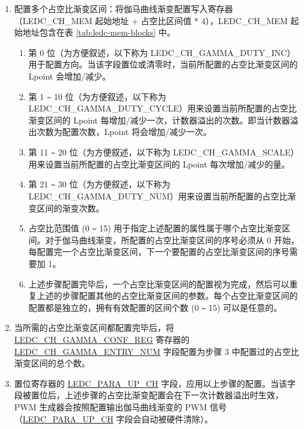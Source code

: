 \documentclass[main\_\_CN.tex]{subfiles}
\begin{document}
\begin{enumerate}
\begin{enumerate}
\begin{enumerate}
    \item 配置多个占空比渐变区间：将伽马曲线渐变配置写入寄存器（LEDC\_CH\_MEM 起始地址 + 占空比区间值 * 4），LEDC\_CH\_MEM  起始地址包含在表 \ref{tab:ledc-mem-blocks} 中。
    \begin{enumerate}
        \item 第 0 位（为方便叙述，以下称为 LEDC\_CH\_GAMMA\_DUTY\_INC）用于配置方向。当该字段置位或清零时，当前所配置的占空比渐变区间的 Lpoint 会增加/减少。
        \item 第 1 \verb+~+ 10 位（为方便叙述，以下称为 LEDC\_CH\_GAMMA\_DUTY\_CYCLE）用来设置当前所配置的占空比渐变区间的 Lpoint 每增加/减少一次，计数器溢出的次数。即当计数器溢出次数为配置次数，Lpoint 将会增加/减少一次。
        \item 第 11 \verb+~+ 20 位（为方便叙述，以下称为 LEDC\_CH\_GAMMA\_SCALE）用来设置当前所配置的占空比渐变区间的 Lpoint 每次增加/减少的量。
        \item 第 21 \verb+~+ 30 位（为方便叙述，以下称为 LEDC\_CH\_GAMMA\_DUTY\_NUM）用来设置当前所配置的占空比渐变区间的渐变次数。
        \item 占空比范围值 (0 \verb+~+ 15) 用于指定上述配置的属性属于哪个占空比渐变区间。对于伽马曲线渐变，所配置的占空比渐变区间的序号必须从 0 开始，每配置完一个占空比渐变区间，下一个要配置的占空比渐变区间的序号需要加 1。
        \item 上述步骤配置完毕后，一个占空比渐变区间的配置视为完成，然后可以重复上述的步骤配置其他的占空比渐变区间的参数。每个占空比渐变区间的配置都是独立的，拥有有效配置的区间个数 (0 \verb+~+ 15) 可以是任意的。
    \end{enumerate}
    \item 当所需的占空比渐变区间都配置完毕后，将 \hyperref[regdesc:LEDCCHNGAMMACONFREG]{LEDC\_CH\_GAMMA\_CONF\_REG} 寄存器的 \hyperref[fielddesc:LEDCCHNGAMMAENTRYNUM]{LEDC\_CH\_GAMMA\_ENTRY\_NUM} 字段配置为步骤 3 中配置过的占空比渐变区间的总个数。
    \item 置位寄存器的 \hyperref[fielddesc:LEDCPARAUPCHN]{LEDC\_PARA\_UP\_CH} 字段，应用以上步骤的配置。当该字段被置位后，上述步骤的占空比渐变配置会在下一次计数器溢出时生效，PWM 生成器会按照配置输出伽马曲线渐变的 PWM 信号（\hyperref[fielddesc:LEDCPARAUPCHN]{LEDC\_PARA\_UP\_CH} 字段会自动被硬件清除）。
\end{enumerate}
\end{enumerate}
\end{enumerate}
\end{document}

